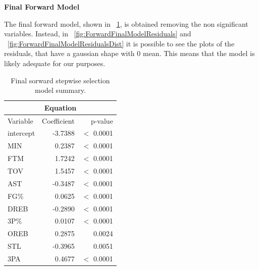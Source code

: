 \vspace{0.2cm}
\noindent
\textbf{Final Forward Model}

The final forward model, shown in \Tab~\ref{table:ForwardFinalModelSummary}, is obtained removing the non significant variables. Instead, in \Fig~\ref{fig:ForwardFinalModelResiduals} and \Fig~\ref{fig:ForwardFinalModelResidualsDist} it is possible to see the plots of the residuals, that have a gaussian shape with 0 mean. This means that the model is likely adequate for our purposes.

\begin{table}[H]
	\centering
	\begin{tabular}{|| l | r | r ||} 
		\hline
		\multicolumn{3}{|c|}{Equation} \\
		\hline
		Variable & Coefficient & p-value \\
		\hline
		intercept & -3.7388 & $<$ 0.0001 \\
		MIN & 0.2387 & $<$ 0.0001 \\
		FTM & 1.7242 & $<$ 0.0001 \\
		TOV & 1.5457 & $<$ 0.0001 \\
		AST & -0.3487 & $<$ 0.0001 \\
		FG\% & 0.0625 & $<$ 0.0001 \\
		DREB & -0.2890 & $<$ 0.0001 \\
		3P\% & 0.0107 & $<$ 0.0001 \\
		OREB & 0.2875 & 0.0024 \\
		STL & -0.3965 & 0.0051 \\
		3PA & 0.4677 & $<$ 0.0001 \\
		\hline
	\end{tabular}
	\caption{Final sorward stepwise selection model summary.}
	\label{table:ForwardFinalModelSummary}
\end{table}

